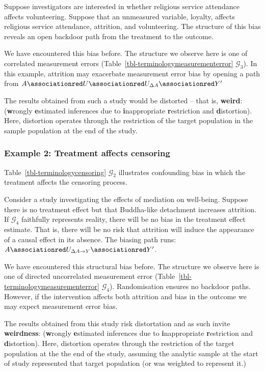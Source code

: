 \documentclass[
  single column]{article}
\begin{document}
Suppose investigators are interested in whether religious service
attendance affects volunteering. Suppose that an unmeasured variable,
loyalty, affects religious service attendance, attrition, and
volunteering. The structure of this bias reveals an open backdoor path
from the treatment to the outcome.

We have encountered this bias before. The structure we observe here is
one of correlated measurement errors
(Table~\ref{tbl-terminologymeasurementerror} \(\mathcal{G}_3\)). In this
example, attrition may exacerbate measurement error bias by opening a
path from
\(A \associationred U \associationred U_{\Delta{A}}  \associationred Y'\)

The results obtained from such a study would be distorted -- that is,
\textbf{weird}: (\textbf{w}rongly \textbf{e}stimated inferences due to
\textbf{i}nappropriate \textbf{r}estriction and \textbf{d}istortion).
Here, distortion operates through the restriction of the target
population in the sample population at the end of the study.

\subsubsection{Example 2: Treatment affects
censoring}\label{example-2-treatment-affects-censoring}

Table~\ref{tbl-terminologycensoring} \(\mathcal{G}_2\) illustrates
confounding bias in which the treatment affects the censoring process.

Consider a study investigating the effects of mediation on well-being.
Suppose there is no treatment effect but that Buddha-like detachment
increases attrition. If \(\mathcal{G}_4\) faithfully represents reality,
there will be no bias in the treatment effect estimate. That is, there
will be no risk that attrition will induce the appearance of a causal
effect in its absence. The biasing path runs:
\(A \associationred U_{\Delta{A\to Y}}  \associationred Y'\).

We have encountered this structural bias before. The structure we
observe here is one of directed uncorrelated measurement error
(Table~\ref{tbl-terminologymeasurementerror} \(\mathcal{G}_4\)).
Randomisation ensures no backdoor paths. However, if the intervention
affects both attrition and bias in the outcome we may expect measurement
error bias.

The results obtained from this study risk distortation and as such
invite \textbf{weirdness}: (\textbf{w}rongly \textbf{e}stimated
inferences due to \textbf{i}nappropriate \textbf{r}estriction and
\textbf{d}istortion). Here, distortion operates through the restriction
of the target population at the the end of the study, assuming the
analytic sample at the start of study represented that target population
(or was weighted to represent it.)
\end{document}
